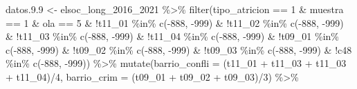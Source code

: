 \documentclass[
  12pt,
]{book}
\newenvironment{Shaded}{\begin{snugshade}}{\end{snugshade}}
\newcommand{\AttributeTok}[1]{\textcolor[rgb]{0.77,0.63,0.00}{#1}}
\newcommand{\DecValTok}[1]{\textcolor[rgb]{0.00,0.00,0.81}{#1}}
\newcommand{\FloatTok}[1]{\textcolor[rgb]{0.00,0.00,0.81}{#1}}
\newcommand{\FunctionTok}[1]{\textcolor[rgb]{0.00,0.00,0.00}{#1}}
\newcommand{\NormalTok}[1]{#1}
\newcommand{\OtherTok}[1]{\textcolor[rgb]{0.56,0.35,0.01}{#1}}
\newcommand{\SpecialCharTok}[1]{\textcolor[rgb]{0.00,0.00,0.00}{#1}}
\begin{document}
\begin{Shaded}
\begin{Highlighting}[]
\NormalTok{datos.}\FloatTok{9.9} \OtherTok{\textless{}{-}}\NormalTok{ elsoc\_long\_2016\_2021 }\SpecialCharTok{\%\textgreater{}\%}
  \FunctionTok{filter}\NormalTok{(tipo\_atricion }\SpecialCharTok{==} \DecValTok{1} \SpecialCharTok{\&}\NormalTok{ muestra }\SpecialCharTok{==} \DecValTok{1} \SpecialCharTok{\&}\NormalTok{ ola }\SpecialCharTok{==} \DecValTok{5} \SpecialCharTok{\&} 
           \SpecialCharTok{!}\NormalTok{t11\_01 }\SpecialCharTok{\%in\%} \FunctionTok{c}\NormalTok{(}\SpecialCharTok{{-}}\DecValTok{888}\NormalTok{, }\SpecialCharTok{{-}}\DecValTok{999}\NormalTok{) }\SpecialCharTok{\&} \SpecialCharTok{!}\NormalTok{t11\_02 }\SpecialCharTok{\%in\%} \FunctionTok{c}\NormalTok{(}\SpecialCharTok{{-}}\DecValTok{888}\NormalTok{, }\SpecialCharTok{{-}}\DecValTok{999}\NormalTok{) }\SpecialCharTok{\&} \SpecialCharTok{!}\NormalTok{t11\_03 }\SpecialCharTok{\%in\%} \FunctionTok{c}\NormalTok{(}\SpecialCharTok{{-}}\DecValTok{888}\NormalTok{, }\SpecialCharTok{{-}}\DecValTok{999}\NormalTok{) }\SpecialCharTok{\&}
           \SpecialCharTok{!}\NormalTok{t11\_04 }\SpecialCharTok{\%in\%} \FunctionTok{c}\NormalTok{(}\SpecialCharTok{{-}}\DecValTok{888}\NormalTok{, }\SpecialCharTok{{-}}\DecValTok{999}\NormalTok{) }\SpecialCharTok{\&}
           \SpecialCharTok{!}\NormalTok{t09\_01 }\SpecialCharTok{\%in\%} \FunctionTok{c}\NormalTok{(}\SpecialCharTok{{-}}\DecValTok{888}\NormalTok{, }\SpecialCharTok{{-}}\DecValTok{999}\NormalTok{) }\SpecialCharTok{\&} \SpecialCharTok{!}\NormalTok{t09\_02 }\SpecialCharTok{\%in\%} \FunctionTok{c}\NormalTok{(}\SpecialCharTok{{-}}\DecValTok{888}\NormalTok{, }\SpecialCharTok{{-}}\DecValTok{999}\NormalTok{) }\SpecialCharTok{\&} \SpecialCharTok{!}\NormalTok{t09\_03 }\SpecialCharTok{\%in\%} \FunctionTok{c}\NormalTok{(}\SpecialCharTok{{-}}\DecValTok{888}\NormalTok{, }\SpecialCharTok{{-}}\DecValTok{999}\NormalTok{) }\SpecialCharTok{\&} 
           \SpecialCharTok{!}\NormalTok{c48 }\SpecialCharTok{\%in\%} \FunctionTok{c}\NormalTok{(}\SpecialCharTok{{-}}\DecValTok{888}\NormalTok{, }\SpecialCharTok{{-}}\DecValTok{999}\NormalTok{)) }\SpecialCharTok{\%\textgreater{}\%}
  \FunctionTok{mutate}\NormalTok{(}\AttributeTok{barrio\_confli =}\NormalTok{ (t11\_01 }\SpecialCharTok{+}\NormalTok{ t11\_03 }\SpecialCharTok{+}\NormalTok{ t11\_03 }\SpecialCharTok{+}\NormalTok{ t11\_04)}\SpecialCharTok{/}\DecValTok{4}\NormalTok{,}
         \AttributeTok{barrio\_crim =}\NormalTok{ (t09\_01 }\SpecialCharTok{+}\NormalTok{ t09\_02 }\SpecialCharTok{+}\NormalTok{ t09\_03)}\SpecialCharTok{/}\DecValTok{3}\NormalTok{) }\SpecialCharTok{\%\textgreater{}\%}

\end{Highlighting}
\end{Shaded}
\end{document}
